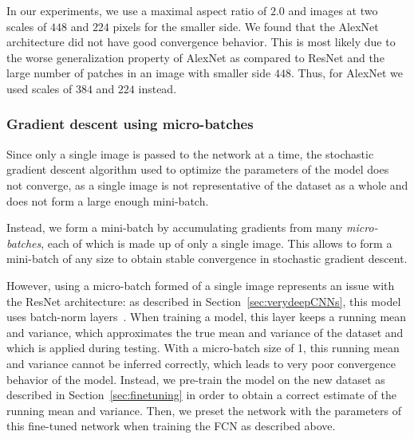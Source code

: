 In our experiments, we use a maximal aspect ratio of $2.0$ and images
at two scales of $448$ and $224$ pixels for the smaller side. We found
that the AlexNet architecture did not have good convergence behavior.
This is most likely due to the worse generalization property of AlexNet
as compared to ResNet and the large number of patches in an image with
smaller side $448$. Thus, for AlexNet we used scales of $384$ and $224$ instead.

\subsubsection{Gradient descent using micro-batches}
Since only a single image is passed to the network at a time, the
stochastic gradient descent algorithm used to optimize the parameters
of the model does not converge, as a single image is not representative
of the dataset as a whole and does not form a large enough mini-batch.

Instead, we form a mini-batch by accumulating gradients from many
\emph{micro-batches}, each of which is made up of only a single image.
This allows to form a mini-batch of any size to obtain stable convergence
in stochastic gradient descent.

However, using a micro-batch formed of a single image represents an issue
with the ResNet architecture: as described in Section~\ref{sec:verydeepCNNs},
this model uses batch-norm layers~\cite{ioffe_batch_2015}.
When training a model, this layer keeps a running
mean and variance, which approximates the true mean and variance of the
dataset and which is applied during testing. With a micro-batch size
of 1, this running mean and variance cannot be inferred correctly,
which leads to very poor convergence behavior of the model.
Instead, we pre-train the model on the new
dataset as described in Section~\ref{sec:finetuning} in order to obtain
a correct estimate of the running mean and variance. Then, we preset the
network with the parameters of this fine-tuned network when training the
FCN as described above.


